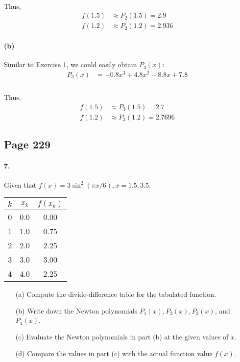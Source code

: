\documentclass{article}  %
\begin{document}
        \paragraph{}Thus,
        \begin{align*}
          f(1.5) &\approx P_2(1.5) = 2.9 \\
          f(1.2) & \approx P_2(1.2) = 2.936
        \end{align*}
        \paragraph{(b)}Similar to Exercise 1, we could easily obtain $P_3(x)$:
        \begin{align*}
          P_3(x) &= -0.8x^3 + 4.8x^2 -8.8x +7.8 \\
        \end{align*}
        \paragraph{}Thus, 
        \begin{align*}
          f(1.5) &\approx P_3(1.5) = 2.7 \\
          f(1.2) & \approx P_3(1.2) = 2.7696
        \end{align*}
        \subsection*{Page 229}
        \paragraph{7.}
        Given that $f(x) = 3\sin^2(\pi x / 6), x = 1.5, 3.5$.
        \begin{table}[h] \label{tab:newton}
        \centering 
        \begin{tabular}{c|c|c}
            \hline
            $k$ & $x_k$ & $f(x_k)$ \\
            \hline
            0 & 0.0 & 0.00 \\
            1 & 1.0 & 0.75 \\
            2 & 2.0 & 2.25 \\
            3 & 3.0 & 3.00 \\
            4 & 4.0 & 2.25 \\
            \hline
        \end{tabular}
        \end{table}
        \begin{enumerate}
        \item[(a)] 
        Compute the divide-difference table for the tabulated function.
        \item[(b)]
        Write down the Newton polynomials $P_1(x), P_2(x), P_3(x)$, and $P_4(x)$.
        \item[(c)]
        Evaluate the Newton polynomials in part (b) at the given values of $x$.
        \item[(d)]
        Compare the values in part (c) with the actual function value $f(x)$.
        \end{enumerate}
\end{document}
